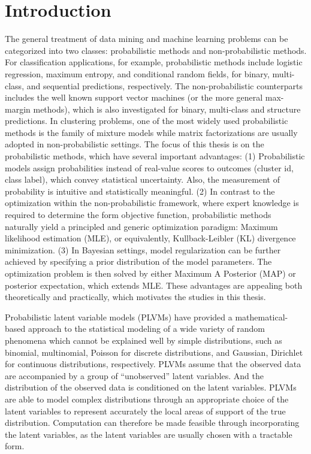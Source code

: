 \chapter{Introduction}

The general treatment of data mining and machine learning problems can be
categorized into two classes: probabilistic methods and non-probabilistic
methods. For classification applications, for example, probabilistic methods
include logistic regression, maximum entropy, and conditional random fields, for
binary, multi-class, and sequential predictions, respectively. The
non-probabilistic counterparts includes the well known support vector machines
(or the more general max-margin methods), which is also investigated for binary,
multi-class and structure predictions. In clustering problems, one of the most
widely used probabilistic methods is the family of mixture models while matrix
factorizations are usually adopted in non-probabilistic settings. The focus of
this thesis is on the probabilistic methods, which have several important
advantages: (1) Probabilistic models assign probabilities instead of real-value
scores to outcomes (cluster id, class label), which convey statistical
uncertainty. Also, the measurement of probability is intuitive and statistically
meaningful. (2) In contrast to the optimization within the non-probabilistic
framework, where expert knowledge is required to determine the form objective
function, probabilistic methods naturally yield a principled and generic
optimization paradigm: Maximum likelihood estimation (MLE), or equivalently,
Kullback-Leibler (KL) divergence minimization. (3) In Bayesian settings, model
regularization can be further achieved by specifying a prior distribution of the
model parameters. The optimization problem is then solved by either Maximum A
Posterior (MAP) or posterior expectation, which extends MLE. These advantages
are appealing both theoretically and practically, which motivates the studies in
this thesis.

Probabilistic latent variable models (PLVMs) have provided a mathematical-based
approach to the statistical modeling of a wide variety of random phenomena which
cannot be explained well by simple distributions, such as binomial, multinomial,
Poisson for discrete distributions, and Gaussian, Dirichlet for continuous
distributions, respectively. PLVMs assume that the observed data are accompanied
by a group of ``unobserved'' latent variables. And the distribution of the
observed data is conditioned on the latent variables. PLVMs are able to model
complex distributions through an appropriate choice of the latent variables to
represent accurately the local areas of support of the true distribution.
Computation can therefore be made feasible through incorporating the latent
variables, as the latent variables are usually chosen with a tractable form.

